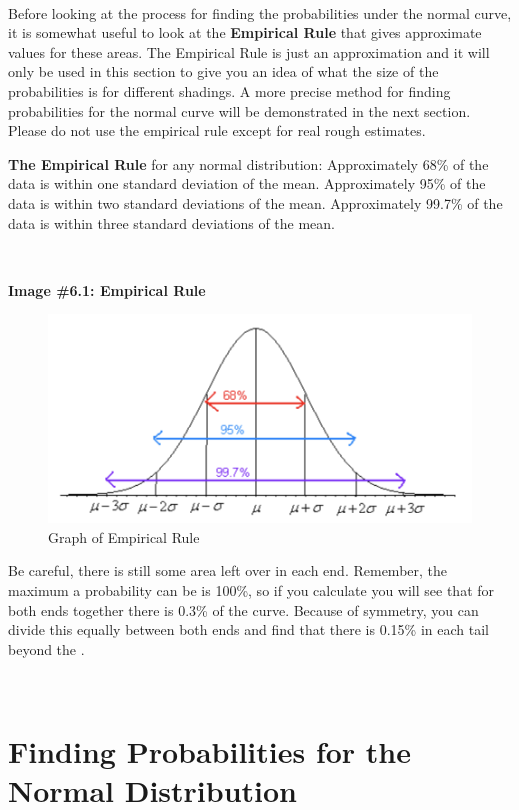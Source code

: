 \documentclass[]{book}
\begin{document}
\textbf{\\
}

Before looking at the process for finding the probabilities under the normal curve, it is somewhat useful to look at the \textbf{Empirical Rule} that gives approximate values for these areas. The Empirical Rule is just an approximation and it will only be used in this section to give you an idea of what the size of the probabilities is for different shadings. A more precise method for finding probabilities for the normal curve will be demonstrated in the next section. Please do not use the
empirical rule except for real rough estimates.

\textbf{The Empirical Rule} for any normal distribution:
Approximately 68\% of the data is within one standard deviation of the
mean.
Approximately 95\% of the data is within two standard deviations of the
mean.
Approximately 99.7\% of the data is within three standard deviations of
the mean.

\textbf{\\
}

\textbf{Image \#6.1: Empirical Rule}

\begin{figure}
\centering
\includegraphics{Empirical_rule.png}
\caption{Graph of Empirical Rule}
\end{figure}

Be careful, there is still some area left over in each end. Remember,
the maximum a probability can be is 100\%, so if you calculate you will
see that for both ends together there is 0.3\% of the curve. Because of
symmetry, you can divide this equally between both ends and find that
there is 0.15\% in each tail beyond the .

\textbf{\\
}

\hypertarget{finding-probabilities-for-the-normal-distribution}{%
\section{Finding Probabilities for the Normal Distribution}\label{finding-probabilities-for-the-normal-distribution}}
\end{document}

